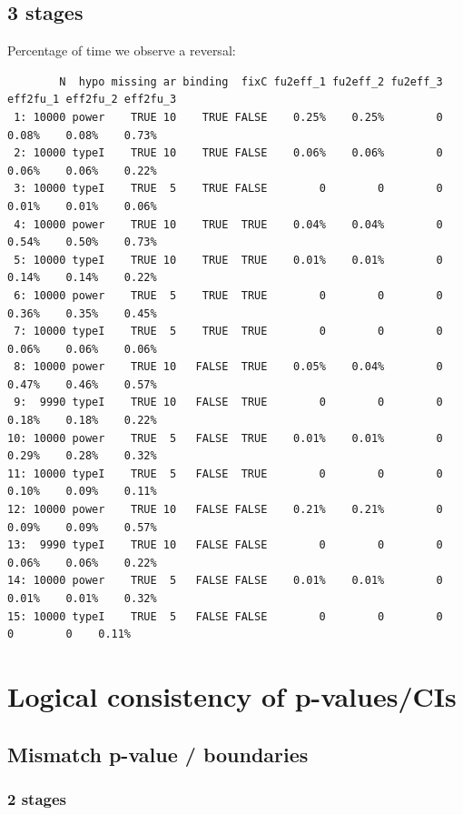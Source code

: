 \documentclass[12pt]{article}
\begin{document}
\subsection{3 stages}
\label{sec:org74127bd}
Percentage of time we observe a reversal:
\begin{verbatim}
        N  hypo missing ar binding  fixC fu2eff_1 fu2eff_2 fu2eff_3 eff2fu_1 eff2fu_2 eff2fu_3
 1: 10000 power    TRUE 10    TRUE FALSE    0.25%    0.25%        0    0.08%    0.08%    0.73%
 2: 10000 typeI    TRUE 10    TRUE FALSE    0.06%    0.06%        0    0.06%    0.06%    0.22%
 3: 10000 typeI    TRUE  5    TRUE FALSE        0        0        0    0.01%    0.01%    0.06%
 4: 10000 power    TRUE 10    TRUE  TRUE    0.04%    0.04%        0    0.54%    0.50%    0.73%
 5: 10000 typeI    TRUE 10    TRUE  TRUE    0.01%    0.01%        0    0.14%    0.14%    0.22%
 6: 10000 power    TRUE  5    TRUE  TRUE        0        0        0    0.36%    0.35%    0.45%
 7: 10000 typeI    TRUE  5    TRUE  TRUE        0        0        0    0.06%    0.06%    0.06%
 8: 10000 power    TRUE 10   FALSE  TRUE    0.05%    0.04%        0    0.47%    0.46%    0.57%
 9:  9990 typeI    TRUE 10   FALSE  TRUE        0        0        0    0.18%    0.18%    0.22%
10: 10000 power    TRUE  5   FALSE  TRUE    0.01%    0.01%        0    0.29%    0.28%    0.32%
11: 10000 typeI    TRUE  5   FALSE  TRUE        0        0        0    0.10%    0.09%    0.11%
12: 10000 power    TRUE 10   FALSE FALSE    0.21%    0.21%        0    0.09%    0.09%    0.57%
13:  9990 typeI    TRUE 10   FALSE FALSE        0        0        0    0.06%    0.06%    0.22%
14: 10000 power    TRUE  5   FALSE FALSE    0.01%    0.01%        0    0.01%    0.01%    0.32%
15: 10000 typeI    TRUE  5   FALSE FALSE        0        0        0        0        0    0.11%
\end{verbatim}


\clearpage

\section{Logical consistency of p-values/CIs}
\label{sec:org1e96399}

\subsection{Mismatch p-value / boundaries}
\label{sec:org59636b8}
\subsubsection{2 stages}
\label{sec:org665545d}
\end{document}
